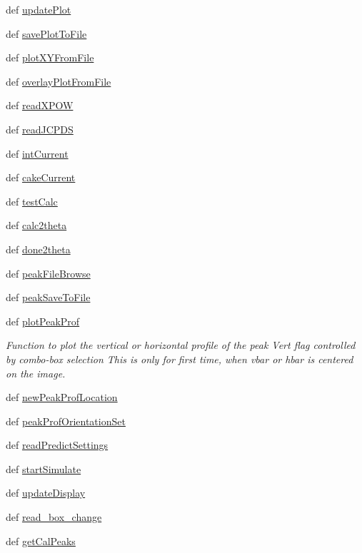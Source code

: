 \begin{DoxyCompactItemize}
def \hyperlink{class_atrex_1_1_atrex_ac277ee5f02ff03bf577c91d2351d3833}{update\-Plot}
\item 
def \hyperlink{class_atrex_1_1_atrex_a5380dd3e2db37a9e6316dcfb2f79da52}{save\-Plot\-To\-File}
\item 
def \hyperlink{class_atrex_1_1_atrex_a51c8994be54b7062fd0b7cc077783f52}{plot\-X\-Y\-From\-File}
\item 
def \hyperlink{class_atrex_1_1_atrex_a4125657b083972e131da1e06587af07f}{overlay\-Plot\-From\-File}
\item 
def \hyperlink{class_atrex_1_1_atrex_a3946e847c41ffc83f4fee8787b1449a7}{read\-X\-P\-O\-W}
\item 
def \hyperlink{class_atrex_1_1_atrex_a82e4c50e20fab4518b71703bdde02994}{read\-J\-C\-P\-D\-S}
\item 
def \hyperlink{class_atrex_1_1_atrex_a4a1adbdba785016117f258c281895688}{int\-Current}
\item 
def \hyperlink{class_atrex_1_1_atrex_a4ed5b63695c617a40eb6fc2c50db7575}{cake\-Current}
\item 
def \hyperlink{class_atrex_1_1_atrex_aa1141a78fc819e7fd22a44e1847a89ba}{test\-Calc}
\item 
def \hyperlink{class_atrex_1_1_atrex_aaa0ad76fcdcdde4e7138ade95031e6c7}{calc2theta}
\item 
def \hyperlink{class_atrex_1_1_atrex_ac75d2b26897d6d799773b27b41ea369b}{done2theta}
\item 
def \hyperlink{class_atrex_1_1_atrex_a4d6871d5055309cbbaddb62e00bfbea5}{peak\-File\-Browse}
\item 
def \hyperlink{class_atrex_1_1_atrex_aaa23b7529d44f3cbbeedfd8434c8bce9}{peak\-Save\-To\-File}
\item 
def \hyperlink{class_atrex_1_1_atrex_a3a5f2aee5b962e1615c54395d9edd172}{plot\-Peak\-Prof}
\begin{DoxyCompactList}\small\item\em Function to plot the vertical or horizontal profile of the peak Vert flag controlled by combo-\/box selection This is only for first time, when vbar or hbar is centered on the image. \end{DoxyCompactList}\item 
def \hyperlink{class_atrex_1_1_atrex_ad7997e5a735ce1b34d713a4b27490fbc}{new\-Peak\-Prof\-Location}
\item 
def \hyperlink{class_atrex_1_1_atrex_a31041eb876dff6083a13777f44d09274}{peak\-Prof\-Orientation\-Set}
\item 
def \hyperlink{class_atrex_1_1_atrex_a8ed3b24c6fdcc06364436368a5112f77}{read\-Predict\-Settings}
\item 
def \hyperlink{class_atrex_1_1_atrex_ad59de2bb679492d17867acb6fffa534e}{start\-Simulate}
\item 
def \hyperlink{class_atrex_1_1_atrex_a9c7db3ee59b336c77f361177d0d14248}{update\-Display}
\item 
def \hyperlink{class_atrex_1_1_atrex_a74436efac3bb11530dbab592fe41c352}{read\-\_\-box\-\_\-change}
\item 
def \hyperlink{class_atrex_1_1_atrex_a8201adc7c4c0956f9adc65b9abdf8172}{get\-Cal\-Peaks}
\end{DoxyCompactItemize}

